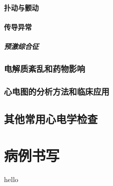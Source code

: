 \documentclass[UTF8]{ctexbook}
\begin{document}
\subsection{扑动与颤动}

\subsection{传导异常}
\subsubsection{预激综合征}

\section{电解质紊乱和药物影响}
\section{心电图的分析方法和临床应用}
\chapter{其他常用心电学检查}

\part{病例书写}
hello

\listoffigures
\listoftables
\end{document}
